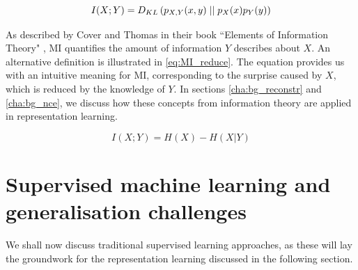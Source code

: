 \begin{equation}
	I(X; Y) =  D_{KL} \left( p_{X, Y}(x, y) \mid \mid p_X(x) p_Y(y) \right)
\end{equation}

As described by Cover and Thomas in their book ``Elements of Information Theory" \cite{coverELEMENTSINFORMATIONTHEORY}, MI quantifies the amount of information $Y$ describes about $X$. An alternative definition is illustrated in \ref{eq:MI_reduce}. The equation provides us with an intuitive meaning for MI, corresponding to the surprise caused by $X$, which is reduced by the knowledge of $Y$. In sections \ref{cha:bg_reconstr} and \ref{cha:bg_nce}, we discuss how these concepts from information theory are applied in representation learning.

\begin{equation}
	I(X;Y)= H(X) - H(X|Y) \label{eq:MI_reduce}
\end{equation}



\section{Supervised machine learning and generalisation challenges}




We shall now discuss traditional supervised learning approaches, as these will lay the groundwork for the representation learning discussed in the following section. 

